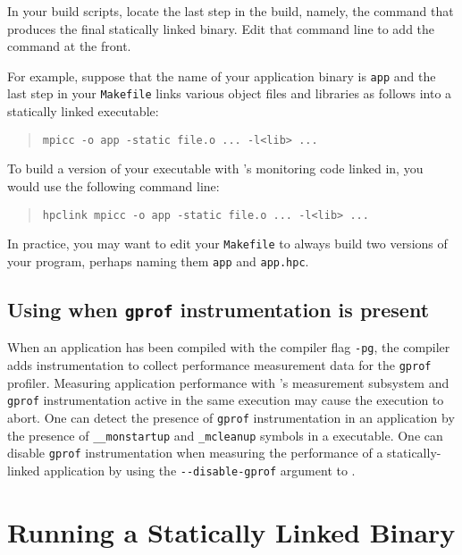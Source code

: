 \documentclass[11pt,letterpaper]{report}
\begin{document}
In your build scripts, locate the last step in the build, namely, the command that produces the final statically linked binary.
Edit that command line to add the \hpclink{} command at the front.

For example, suppose that the name of your application binary is \texttt{app} and the last step in
your \texttt{Makefile} links various object files and libraries as
follows into a statically linked executable:
\begin{quote}
  \verb|mpicc -o app -static file.o ... -l<lib> ...|
\end{quote}
To build a version of your executable with \HPCToolkit's monitoring code linked in, you would use the following command line:
\begin{quote}
  \verb|hpclink mpicc -o app -static file.o ... -l<lib> ...|
\end{quote}

In practice, you may want to edit your \texttt{Makefile} to always build two versions of your program, perhaps naming them \texttt{app} and \texttt{app.hpc}.


\subsection{Using \hpclink{} when {\tt gprof} instrumentation is present}

When an application has been compiled with the compiler flag \verb|-pg|,
the compiler adds instrumentation to collect performance measurement data for
the \verb|gprof| profiler. Measuring application performance with
\HPCToolkit{}'s measurement subsystem and \verb|gprof| instrumentation
active in the same execution may cause the execution
to abort. One can detect the presence of \verb|gprof| instrumentation in an
application by the presence of \verb|__monstartup| and \verb|_mcleanup| symbols
in a executable.
One can disable \verb|gprof| instrumentation when measuring the performance of
a statically-linked application by using the \verb|--disable-gprof|
argument to \hpclink{}.




\section{Running a Statically Linked Binary}
\end{document}
